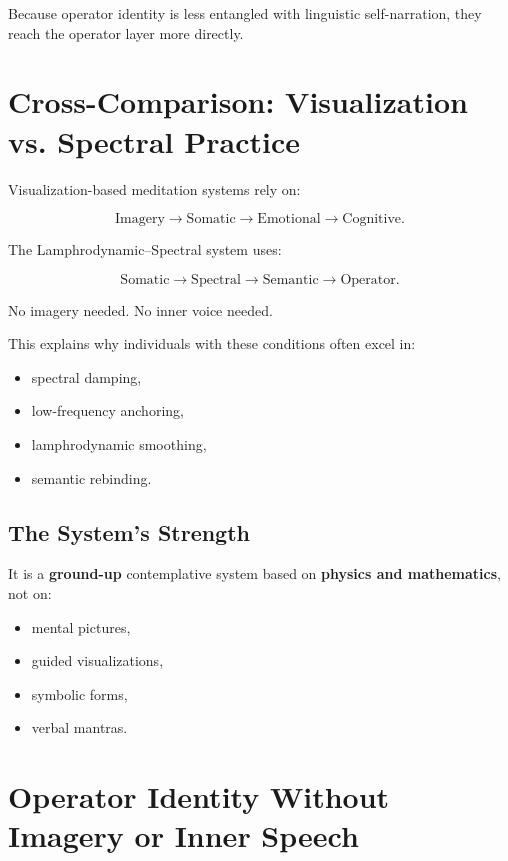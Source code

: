 \documentclass[12pt]{article}
\begin{document}
Because operator identity is less entangled with linguistic self-narration,
they reach the operator layer more directly.


\section{Cross-Comparison: Visualization vs. Spectral Practice}

Visualization-based meditation systems rely on:

\[
\text{Imagery} \rightarrow \text{Somatic} \rightarrow \text{Emotional} \rightarrow \text{Cognitive}.
\]

The Lamphrodynamic–Spectral system uses:

\[
\text{Somatic} \rightarrow \text{Spectral} \rightarrow \text{Semantic} \rightarrow \text{Operator}.
\]

No imagery needed.  
No inner voice needed.

This explains why individuals with these conditions often excel in:

\begin{itemize}
\item spectral damping,
\item low-frequency anchoring,
\item lamphrodynamic smoothing,
\item semantic rebinding.
\end{itemize}

\subsection{The System’s Strength}

It is a \textbf{ground-up} contemplative system
based on \textbf{physics and mathematics}, not on:

\begin{itemize}
\item mental pictures,
\item guided visualizations,
\item symbolic forms,
\item verbal mantras.
\end{itemize}


\section{Operator Identity Without Imagery or Inner Speech}
\end{document}
